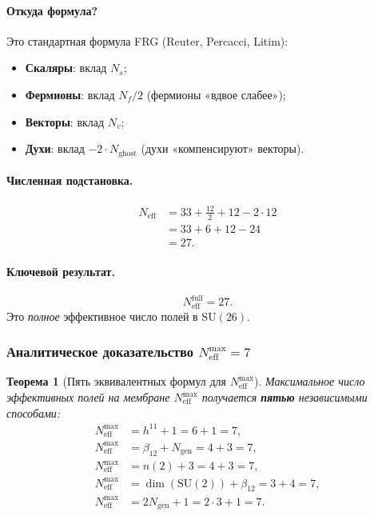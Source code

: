 \documentclass[11pt,a4paper]{article}
\newcommand{\SU}{\mathrm{SU}}
\newcommand{\Ngen}{N_{\text{gen}}}
\newcommand{\Neff}{N_{\text{eff}}}
\newtheorem{theorem}{Теорема}[section]
\theoremstyle{definition}
\begin{document}
\paragraph{Откуда формула?}
Это стандартная формула FRG (Reuter, Percacci, Litim):
\begin{itemize}
    \item \textbf{Скаляры}: вклад $N_s$;
    \item \textbf{Фермионы}: вклад $N_f / 2$ (фермионы «вдвое слабее»);
    \item \textbf{Векторы}: вклад $N_v$;
    \item \textbf{Духи}: вклад $-2 \cdot N_{\text{ghost}}$ 
          (духи «компенсируют» векторы).
\end{itemize}

\paragraph{Численная подстановка.}
\begin{align}
    \Neff &= 33 + \frac{12}{2} + 12 - 2 \cdot 12 \\
          &= 33 + 6 + 12 - 24 \\
          &= 27.
\end{align}

\paragraph{Ключевой результат.}
\begin{equation}
    \boxed{
    \Neff^{\text{full}} = 27.
    }
\end{equation}
Это \emph{полное} эффективное число полей в $\SU(26)$.

\subsubsection{Аналитическое доказательство \texorpdfstring{$\Neff^{\max} = 7$}{N\_eff max = 7}}
\label{subsubsec:neff-max-analytic}

\begin{theorem}[Пять эквивалентных формул для $N_{\text{eff}}^{\max}$]
\label{thm:five-formulas-7-review}
Максимальное число эффективных полей на мембране
$N_{\text{eff}}^{\max}$ получается \textbf{пятью} независимыми
способами:
\begin{align}
    N_{\text{eff}}^{\max} &= h^{11} + 1 = 6 + 1 = 7, \\
    N_{\text{eff}}^{\max} &= \beta_{12} + \Ngen = 4 + 3 = 7, \\
    N_{\text{eff}}^{\max} &= n(2) + 3 = 4 + 3 = 7, \\
    N_{\text{eff}}^{\max} &= \dim(\SU(2)) + \beta_{12} = 3 + 4 = 7, \\
    N_{\text{eff}}^{\max} &= 2 \Ngen + 1 = 2 \cdot 3 + 1 = 7.
\end{align}
\end{theorem}
\end{document}
